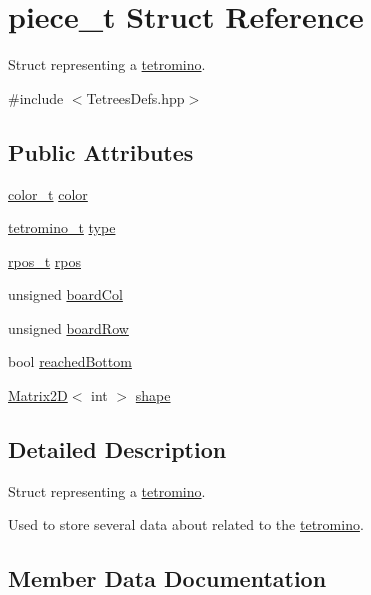 \hypertarget{structpiece__t}{}\section{piece\+\_\+t Struct Reference}
\label{structpiece__t}


Struct representing a \hyperlink{TetreesDefs_8hpp_adf4f8e2cbbd7d8894fe3beda39db1b8f}{tetromino}.  




{\ttfamily \#include $<$Tetrees\+Defs.\+hpp$>$}

\subsection*{Public Attributes}
\begin{DoxyCompactItemize}
\item 
\hyperlink{TetreesDefs_8hpp_a8ba5fbce2446135735693ab60c896bbd}{color\+\_\+t} \hyperlink{structpiece__t_af6408bda8899430d6457a83afb657225}{color}
\item 
\hyperlink{TetreesDefs_8hpp_acd279a62a49ecee418dd808ac39a1795}{tetromino\+\_\+t} \hyperlink{structpiece__t_ac5cbbdb5ff335128af8ca9f491a4f543}{type}
\item 
\hyperlink{TetreesDefs_8hpp_ae8c3bf9765f183eabf1106110513afc6}{rpos\+\_\+t} \hyperlink{structpiece__t_ab1d715c35231b557560096e2d79f4a43}{rpos}
\item 
unsigned \hyperlink{structpiece__t_a1556aab0120dd987a1e679fe13864b2e}{board\+Col}
\item 
unsigned \hyperlink{structpiece__t_a14640fd68c44e80eacbe6adbf8597829}{board\+Row}
\item 
bool \hyperlink{structpiece__t_acb67c9322e157b7dd7c7e0efd212da76}{reached\+Bottom}
\item 
\hyperlink{classMatrix2D}{Matrix2D}$<$ int $>$ \hyperlink{structpiece__t_a3c8f9c2e51c6bab728e564143c439746}{shape}
\end{DoxyCompactItemize}


\subsection{Detailed Description}
Struct representing a \hyperlink{TetreesDefs_8hpp_adf4f8e2cbbd7d8894fe3beda39db1b8f}{tetromino}. 

Used to store several data about related to the \hyperlink{TetreesDefs_8hpp_adf4f8e2cbbd7d8894fe3beda39db1b8f}{tetromino}. 

\subsection{Member Data Documentation}
\mbox{\label{structpiece__t_a1556aab0120dd987a1e679fe13864b2e}} 
